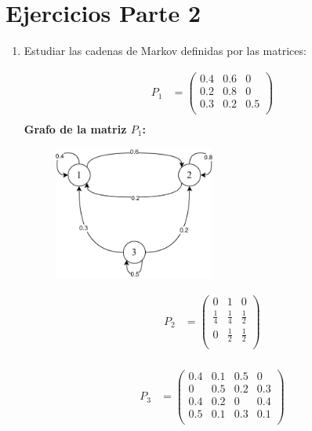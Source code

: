 \documentclass{templateNote}
\begin{document}
\newpage
\section{Ejercicios Parte 2}

\begin{enumerate}
    \item Estudiar las cadenas de Markov definidas por las matrices:
    
    \begin{align*}
        P_1 &= \left(
            \begin{array}{ccc}    
                0.4 & 0.6 & 0\\
                0.2 & 0.8 & 0\\
                0.3 & 0.2 & 0.5\\
            \end{array}
            \right)\\
    \end{align*}
    \textbf{Grafo de la matriz $P_1$:}
    \begin{figure}[H]
        \centering
        \includegraphics[width=0.5\textwidth]{img/ejer1_2.png}
    \end{figure}

    \begin{align*}
        P_2 &= \left(
            \begin{array}{ccc}    
                0   & 1   & 0  \\
                \frac{1}{4} & \frac{1}{4} & \frac{1}{2}  \\
                0 & \frac{1}{2} & \frac{1}{2}\\
            \end{array}
            \right)\\
    \end{align*}

    \begin{align*}
        P_3 &= \left(
            \begin{array}{cccc}    
                0.4&0.1&0.5&0\\
                0&0.5&0.2&0.3\\
                0.4&0.2&0&0.4\\
                0.5&0.1&0.3&0.1\\
            \end{array}
            \right)\\
    \end{align*}


\end{enumerate}
\end{document}
